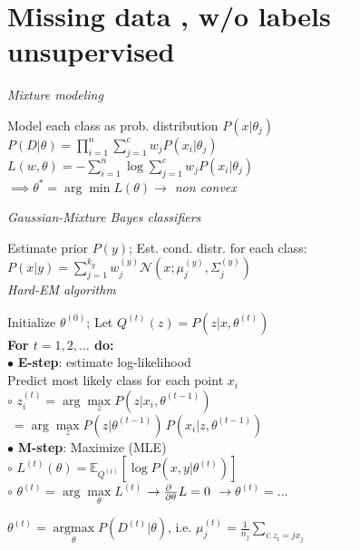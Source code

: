 \section{Missing data
\normalfont\sffamily, w/o labels $\color{section-text-color}\to$ unsupervised}

\emph{Mixture modeling}

Model each class as prob. distribution $P(x|\theta_j)$\\
$P(D|\theta) = \prod_{i=1}^n \sum_{j=1}^c w_j P(x_i|\theta_j)$\\
$L(w, \theta) = - \sum_{i=1}^n \log  \sum_{j=1}^c w_j P(x_i| \theta_j)$\\
$\implies \theta^\ast = \arg\!\min L(\theta)$\enskip\emph{$\to$ non convex}

\emph{Gaussian-Mixture Bayes classifiers}

Estimate prior $P(y)$; Est. cond. distr. for each class:
$P(x|y) = \sum_{j=1}^{k_y} w_j^{(y)} \mathcal{N}(x; \mu_j^{(y)}, \Sigma_j^{(y)})$\\

\emph{Hard-EM algorithm}\vspace{1pt}
\begin{highlightbox}
	Initialize $\theta^{(0)}$; \enskip Let $Q^{(t)} (z) = P(z\vert x,\theta^{(t)})$\\
	\textbf{For $t=1,2,...$ do:}\\
	$\bullet$ \textbf{E-step}: estimate log-likelihood\\
	\phantom{$\bullet$} Predict most likely class for each point $x_i$\\
	\phantom{$\bullet$} $\circ$
		$z_i^{(t)} = \arg\!\max\limits_z P(z\vert x_i,\theta^{(t-1)})$\vspace{-5pt}\\
	\phantom{$\bullet$ $\circ$}
		$\;= \arg\!\max\limits_z P(z\vert\theta^{(t-1)}) \, P(x_i\vert z,\theta^{(t-1)})$\\
	$\bullet$ \textbf{M-step}: Maximize (MLE)\\
	\phantom{$\bullet$} $\circ$
		$L^{(t)} (\theta) = \mathbb{E}_{Q^{(t)}} [\log P(x,y\vert \theta^{(t)})]$\\
	\phantom{$\bullet$} $\circ$
		$\theta^{(t)} = \arg\!\max\limits_\theta L^{(t)}$
		$\to \pderiv{~}{\theta}L = 0$
		$\to \theta^{(t)} = ...$
\end{highlightbox}
$\theta^{(t)} = \underset{\theta}{\operatorname{argmax}} P(D^{(t)}|\theta)$, i.e. $\mu_j^{(t)} = \frac{1}{n_j} \sum_{i: z_i = j x_j}$

